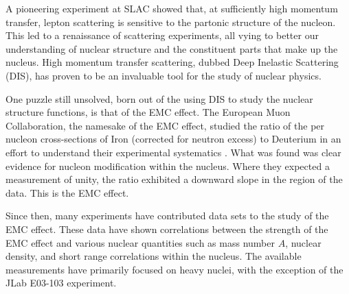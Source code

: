 %
%


A pioneering experiment at SLAC \cite{SLAC_DIS} showed that, at sufficiently high momentum transfer, lepton scattering is sensitive to the partonic structure of the nucleon. This led to a renaissance of scattering experiments, all vying to better our understanding of nuclear structure and the constituent parts that make up the nucleus. High momentum transfer scattering, dubbed Deep Inelastic Scattering (DIS), has proven to be an invaluable tool for the study of nuclear physics.

One puzzle still unsolved, born out of the using DIS to study the nuclear structure functions, is that of the EMC effect. The European Muon Collaboration, the namesake of the EMC effect, studied the ratio of the per nucleon cross-sections of Iron (corrected for neutron excess) to Deuterium in an effort to understand their experimental systematics \cite{emc_FE}. What was found was clear evidence for nucleon modification within the nucleus. Where they expected a measurement of unity, the ratio exhibited a downward slope in the region of the data. This is the EMC effect.

Since then, many experiments have contributed data sets to the study of the EMC effect. These data have shown correlations between the strength of the EMC effect and various nuclear quantities such as mass number $A$, nuclear density, and short range correlations within the nucleus. The available measurements have primarily focused on heavy nuclei, with the exception of the JLab E03-103 experiment.

